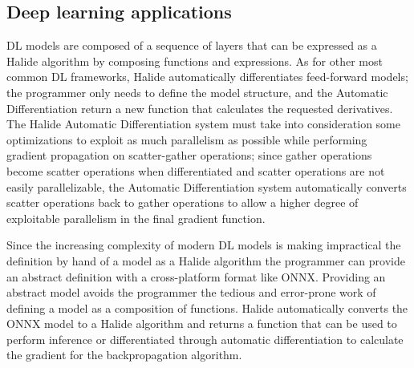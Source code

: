 \documentclass[../main.tex]{subfiles}
\begin{document}
\subsection{Deep learning applications}
DL models are composed of a sequence of layers that can be expressed as a Halide algorithm by composing functions and expressions. As for other most common DL frameworks, Halide automatically differentiates feed-forward models; the programmer only needs to define the model structure, and the Automatic Differentiation return a new function that calculates the requested derivatives.
The Halide Automatic Differentiation \cite{halideDifferentiable} system must take into consideration some optimizations to exploit as much parallelism as possible while performing gradient propagation on scatter-gather operations; since gather operations become scatter operations when differentiated and scatter operations are not easily parallelizable, the Automatic Differentiation system automatically converts scatter operations back to gather operations to allow a higher degree of exploitable parallelism in the final gradient function.

Since the increasing complexity of modern DL models is making impractical the definition by hand of a model as a Halide algorithm the programmer can provide an abstract definition with a cross-platform format like ONNX. Providing an abstract model avoids the programmer the tedious and error-prone work of defining a model as a composition of functions. Halide automatically converts the ONNX model to a Halide algorithm and returns a function that can be used to perform inference or differentiated through automatic differentiation to calculate the gradient for the backpropagation algorithm.
\end{document}

